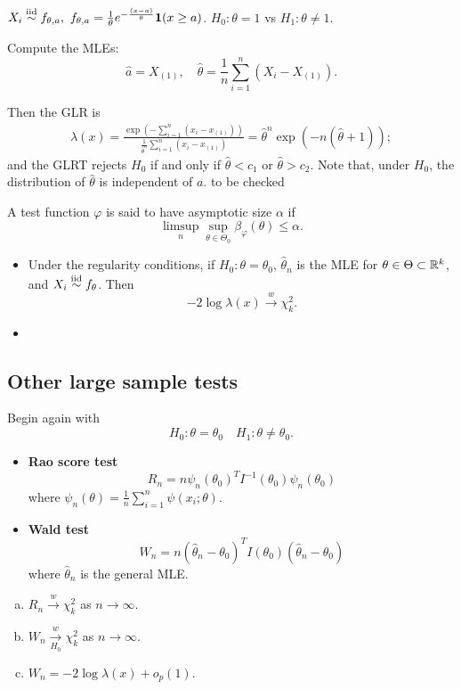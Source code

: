 \begin{exap}
	$X_i \stackrel{\text{iid}}{\sim} f_{\theta,a},\ f_{\theta,a} = \frac{1}{\theta} e^{-\frac{(x-a)}{\theta}} \boldsymbol{1}(x \geq a)$. $H_0: \theta = 1$ vs $H_1: \theta\neq 1$.
	
	Compute the MLEs:
	$$\hat{a} = X_{(1)},\quad \hat{\theta} = \frac{1}{n} \sum_{i=1}^n (X_i - X_{(1)}).$$
	
	Then the  GLR is
	\begin{align*}
		\lambda(x) = \frac{ \exp( -\sum_{i=1}^n (x_i - x_{(1)} )) }{ \frac{1}{\hat{\theta}^n} \sum_{i=1}^n (x_i - x_{(1)} ) } = \hat{\theta}^n \exp( -n(\hat{\theta} + 1 ) );
	\end{align*}
	and the GLRT rejects $H_0$ if and only if $\hat{\theta} < c_1$ or $\hat{\theta} > c_2$. Note that, under $H_0$, the distribution of $\hat{\theta}$ is independent of $a$.
	{\color{red}to be checked}
\end{exap}

\begin{mydef}
	A test function $\varphi$ is said to have asymptotic size $\alpha$ if 
	$$\limsup_n \sup_{\theta \in \Theta_0} \beta_\varphi (\theta) \leq \alpha.$$
\end{mydef}


\begin{thm}[Wilk] \textbf{ }
	\begin{itemize}
		\item Under the regularity conditions, if $H_0:\theta=\theta_0$, $\hat{\theta}_n$ is the MLE for $\theta \in \Theta \subset \mathbb{R}^k$, and $X_i \stackrel{\text{iid}}{\sim} f_\theta$. Then 
		$$ -2 \log \lambda(x) \xrightarrow{w} \chi^2_k.$$
		\item 
	\end{itemize}
\end{thm}
 

\subsection{Other large sample tests}
\begin{mydef} Begin again with
	$$H_0: \theta = \theta_0 \quad H_1: \theta \neq \theta_0.$$
	\begin{itemize}
		\item \textbf{Rao score test}
			$$R_n = n \psi _n (\theta_0)^T I^{-1}(\theta_0) \psi_n (\theta_0)$$
			where $\psi_n(\theta) = \frac{1}{n} \sum_{i=1}^n \psi(x_i; \theta)$.
		\item \textbf{Wald test}
			$$W_n = n(\hat{\theta}_n - \theta_0)^T I(\theta_0) (\hat{\theta}_n - \theta_0) $$
			where $\hat{\theta}_n$ is the general MLE.
	\end{itemize}
\end{mydef} 

\begin{prop}
	\begin{enumerate}[a)]
		\item $R_n \xrightarrow{w} \chi^2_k$ as $n\to \infty$.
		
		\item $W_n \xrightarrow[H_0]{w} \chi^2_k$ as $n\to \infty$. 

		\item $W_n = -2 \log \lambda(x) + o_p(1)$.
	\end{enumerate}
\end{prop} 